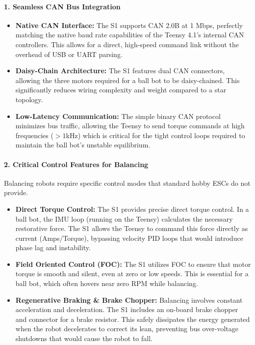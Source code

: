 \documentclass[12pt]{article}
\begin{document}
\paragraph{1. Seamless CAN Bus Integration}
\begin{itemize}
    \item \textbf{Native CAN Interface:} The S1 supports CAN 2.0B at 1 Mbps, perfectly matching the native baud rate capabilities of the Teensy 4.1’s internal CAN controllers. This allows for a direct, high-speed command link without the overhead of USB or UART parsing.
    \item \textbf{Daisy-Chain Architecture:} The S1 features dual CAN connectors, allowing the three motors required for a ball bot to be daisy-chained. This significantly reduces wiring complexity and weight compared to a star topology.
    \item \textbf{Low-Latency Communication:} The simple binary CAN protocol minimizes bus traffic, allowing the Teensy to send torque commands at high frequencies ($>1$kHz) which is critical for the tight control loops required to maintain the ball bot's unstable equilibrium.
\end{itemize}

\paragraph{2. Critical Control Features for Balancing}
Balancing robots require specific control modes that standard hobby ESCs do not provide.
\begin{itemize}
    \item \textbf{Direct Torque Control:} The S1 provides precise direct torque control. In a ball bot, the IMU loop (running on the Teensy) calculates the necessary restorative force. The S1 allows the Teensy to command this force directly as current (Amps/Torque), bypassing velocity PID loops that would introduce phase lag and instability.
    \item \textbf{Field Oriented Control (FOC):} The S1 utilizes FOC to ensure that motor torque is smooth and silent, even at zero or low speeds. This is essential for a ball bot, which often hovers near zero RPM while balancing.
    \item \textbf{Regenerative Braking \& Brake Chopper:} Balancing involves constant acceleration and deceleration. The S1 includes an on-board brake chopper and connector for a brake resistor. This safely dissipates the energy generated when the robot decelerates to correct its lean, preventing bus over-voltage shutdowns that would cause the robot to fall.
\end{itemize}
\end{document}
